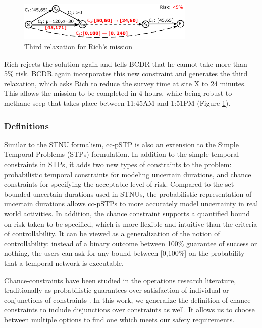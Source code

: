 \documentclass[jair,twoside,11pt,theapa]{article}
\begin{document}
\begin{figure}[htb!]
	\centering
	\includegraphics[width=0.75\textwidth]{figures/ccpstp_example_s3.pdf}
	\caption{Third relaxation for Rich's mission}
	\label{fig:sample_ccpstp_sol3}
\end{figure}



Rich rejects the solution again and tells BCDR that he cannot take more than
5\% risk. BCDR again incorporates this new constraint and generates the third
relaxation, which asks Rich to reduce the survey time
at site X to 24 minutes. This allows the mission to be
completed in 4 hours, while being robust to methane seep that takes place between 11:45AM and
1:51PM (Figure \ref{fig:sample_ccpstp_sol3}).




\subsubsection{Definitions}

Similar to the STNU formalism, cc-pSTP is also an extension to the Simple
Temporal Problems (STPs) formulation. In addition to the simple temporal
constraints in STPs, it adds two new types of constraints to the problem:
probabilistic temporal constraints for modeling uncertain durations, and chance
constraints for specifying the acceptable level of risk. Compared to the
set-bounded uncertain durations used in STNUs, the
probabilistic representation of uncertain durations allows cc-pSTPs to more
accurately model uncertainty in real world activities. In addition, the chance
constraint supports a quantified bound on risk taken to be specified, which is
more flexible and intuitive than the criteria of controllability. It can be
viewed as a generalization of the notion of controllability: instead of a binary
outcome between 100\% guarantee of success or nothing, the users can ask for any
bound between [0,100\%] on the probability that a temporal network is
executable.

Chance-constraints have been studied in the operations research literature,
traditionally as probabilistic guarantees over satisfaction of  individual or
conjunctions of constraints \cite{kall1976chance}. In this work, we generalize
the definition of chance-constraints to include disjunctions over constraints as
well. It allows us to choose between multiple options to find one which meets
our safety requirements.
\end{document}
